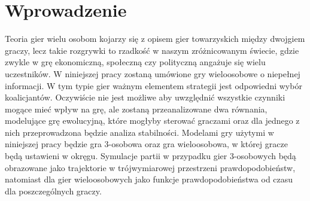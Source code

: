 \chapter{Wprowadzenie}
\label{cha:wprowadzenie}

Teoria gier wielu osobom kojarzy się z opisem gier towarzyskich między dwojgiem graczy, lecz takie rozgrywki to rzadkość w naszym zróżnicowanym świecie, gdzie zwykle w grę ekonomiczną, społeczną czy polityczną angażuje się wielu uczestników. W niniejszej pracy zostaną umówione gry wieloosobowe o niepełnej informacji. W tym typie gier ważnym elementem strategii jest odpowiedni wybór koalicjantów. Oczywiście nie jest możliwe aby uwzględnić wszystkie czynniki mogące mieć wpływ na grę, ale zostaną przeanalizowane dwa równania, modelujące grę ewolucyjną, które mogłyby sterować graczami oraz dla jednego z nich przeprowadzona będzie analiza stabilności. Modelami gry użytymi w niniejszej pracy będzie gra 3-osobowa oraz gra wieloosobowa, w której gracze będą ustawieni w okręgu. Symulacje partii w przypadku gier 3-osobowych będą obrazowane jako trajektorie w trójwymiarowej przestrzeni prawdopodobieństw, natomiast dla gier wieloosobowych jako funkcje prawdopodobieństwa od czasu dla poszczególnych graczy.
